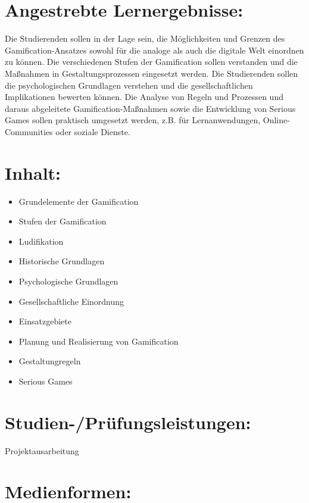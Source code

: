 \section{Angestrebte
Lernergebnisse:}\label{angestrebte-lernergebnisse-23}

Die Studierenden sollen in der Lage sein, die Möglichkeiten und Grenzen
des Gamification-Ansatzes sowohl für die analoge als auch die digitale
Welt einordnen zu können. Die verschiedenen Stufen der Gamification
sollen verstanden und die Maßnahmen in Gestaltungsprozessen eingesetzt
werden. Die Studierenden sollen die psychologischen Grundlagen verstehen
und die gesellschaftlichen Implikationen bewerten können. Die Analyse
von Regeln und Prozessen und daraus abgeleitete Gamification-Maßnahmen
sowie die Entwicklung von Serious Games sollen praktisch umgesetzt
werden, z.B. für Lernanwendungen, Online-Communities oder soziale
Dienste.

\section{Inhalt:}\label{inhalt-23}

\begin{itemize}
\tightlist
\item
  Grundelemente der Gamification
\item
  Stufen der Gamification
\item
  Ludifikation
\item
  Historische Grundlagen
\item
  Psychologische Grundlagen
\item
  Gesellschaftliche Einordnung
\item
  Einsatzgebiete
\item
  Planung und Realisierung von Gamification
\item
  Gestaltungregeln
\item
  Serious Games
\end{itemize}

\section{Studien-/Prüfungsleistungen:}\label{studien-pruxfcfungsleistungen-23}

Projektausarbeitung

\section{Medienformen:}\label{medienformen-23}

